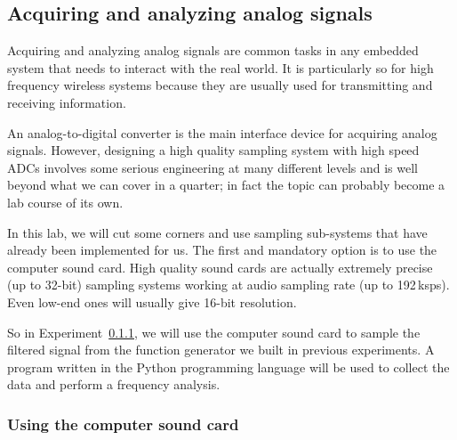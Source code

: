 \documentclass[letterpaper, 11pt]{article}
\begin{document}
\subsection{Acquiring and analyzing analog signals}
\label{sec:adc}

Acquiring and analyzing analog signals are common tasks in any embedded system that needs to interact with the real world. It is particularly so for high frequency wireless systems because they are usually used for transmitting and receiving information. 

An analog-to-digital converter is the main interface device for acquiring analog signals. However, designing a high quality sampling system with high speed ADCs involves some serious engineering at many different levels and is well beyond what we can cover in a quarter; in fact the topic can probably become a lab course of its own. 

In this lab, we will cut some corners and use sampling sub-systems that have already been implemented for us. The first and mandatory option is to use the computer sound card. High quality sound cards are actually extremely precise (up to 32-bit) sampling systems working at audio sampling rate (up to 192\,ksps). Even low-end ones will usually give 16-bit resolution.

So in Experiment~\ref{sec:soundcard}, we will use the computer sound card to sample the filtered signal from the function generator we built in previous experiments. A program written in the Python programming language will be used to collect the data and perform a frequency analysis. 

\subsubsection{Using the computer sound card}
\label{sec:soundcard}
\end{document}
